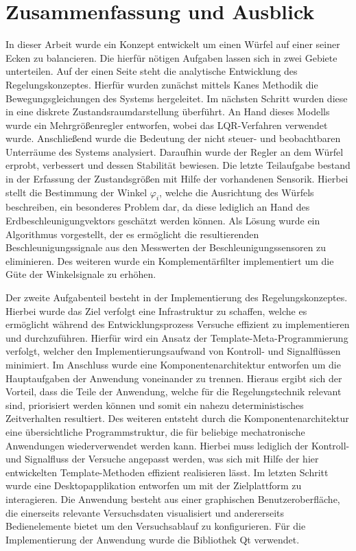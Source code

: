 \chapter{Zusammenfassung und Ausblick}
In dieser Arbeit wurde ein Konzept entwickelt um einen Würfel auf einer seiner Ecken zu balancieren. Die hierfür nötigen Aufgaben lassen sich in zwei Gebiete unterteilen. Auf der einen Seite steht die analytische Entwicklung des Regelungskonzeptes. Hierfür wurden zunächst mittels Kanes Methodik die Bewegungsgleichungen des Systems hergeleitet. Im nächsten Schritt wurden diese in eine diskrete Zustandsraumdarstellung überführt. An Hand dieses Modells wurde ein Mehrgrößenregler entworfen, wobei das LQR-Verfahren verwendet wurde. Anschließend wurde die Bedeutung der nicht steuer- und beobachtbaren Unterräume des Systems analysiert. Daraufhin wurde der Regler an dem Würfel erprobt, verbessert und dessen Stabilität bewiesen.
Die letzte Teilaufgabe bestand in der Erfassung der Zustandsgrößen mit Hilfe der vorhandenen Sensorik. Hierbei stellt die Bestimmung der Winkel $\varphi_i$, welche die Ausrichtung des Würfels beschreiben, ein besonderes Problem dar, da diese lediglich an Hand des Erdbeschleunigungvektors geschätzt werden können. Als Lösung wurde ein Algorithmus vorgestellt, der es ermöglicht die resultierenden Beschleunigungssignale aus den Messwerten der Beschleunigungssensoren zu eliminieren. Des weiteren wurde ein Komplementärfilter implementiert um die Güte der Winkelsignale zu erhöhen.

Der zweite Aufgabenteil besteht in der Implementierung des Regelungskonzeptes. Hierbei wurde das Ziel verfolgt eine Infrastruktur zu schaffen, welche es ermöglicht während des Entwicklungsprozess Versuche effizient zu implementieren und durchzuführen. Hierfür wird ein Ansatz der Template-Meta-Programmierung verfolgt, welcher den Implementierungsaufwand von Kontroll- und Signalflüssen minimiert. Im Anschluss wurde eine Komponentenarchitektur entworfen um die Hauptaufgaben der Anwendung voneinander zu trennen. Hieraus ergibt sich der Vorteil, dass die Teile der Anwendung, welche für die Regelungstechnik relevant sind, priorisiert werden können und somit ein nahezu deterministisches Zeitverhalten resultiert. Des weiteren entsteht durch die Komponentenarchitektur eine übersichtliche Programmstruktur, die für beliebige mechatronische Anwendungen wiederverwendet werden kann. Hierbei muss lediglich der Kontroll- und Signalfluss der Versuche angepasst werden, was sich mit Hilfe der hier entwickelten Template-Methoden effizient realisieren lässt. Im letzten Schritt wurde eine Desktopapplikation entworfen um mit der Zielplattform zu interagieren. Die Anwendung besteht aus einer graphischen Benutzeroberfläche, die einerseits relevante Versuchsdaten visualisiert und andererseits Bedienelemente bietet um den Versuchsablauf zu konfigurieren. Für die Implementierung der Anwendung wurde die Bibliothek Qt verwendet.


